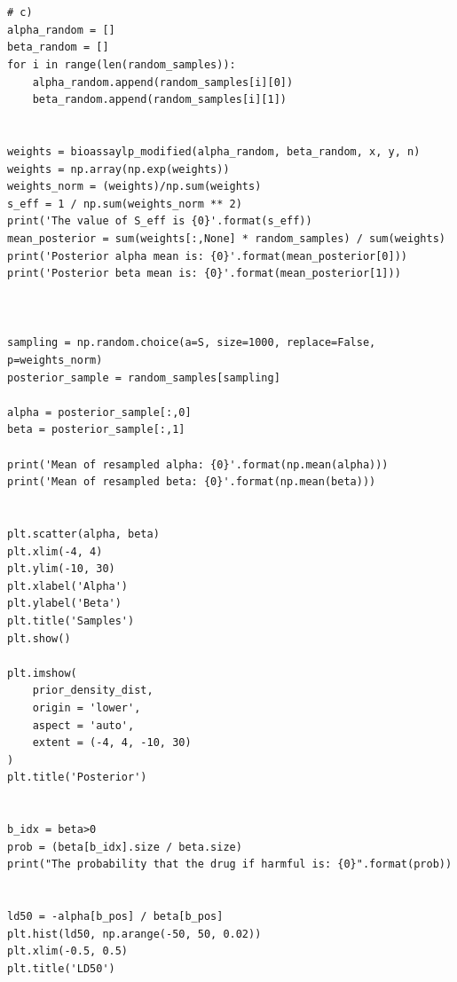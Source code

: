 \documentclass[17pt]{article}
\begin{document}
\begin{lstlisting}
    
    
# c)
alpha_random = []
beta_random = []
for i in range(len(random_samples)):
    alpha_random.append(random_samples[i][0])
    beta_random.append(random_samples[i][1])

    
weights = bioassaylp_modified(alpha_random, beta_random, x, y, n)
weights = np.array(np.exp(weights))
weights_norm = (weights)/np.sum(weights)
s_eff = 1 / np.sum(weights_norm ** 2)
print('The value of S_eff is {0}'.format(s_eff))
mean_posterior = sum(weights[:,None] * random_samples) / sum(weights)
print('Posterior alpha mean is: {0}'.format(mean_posterior[0]))
print('Posterior beta mean is: {0}'.format(mean_posterior[1]))



sampling = np.random.choice(a=S, size=1000, replace=False, p=weights_norm)
posterior_sample = random_samples[sampling]

alpha = posterior_sample[:,0]
beta = posterior_sample[:,1]

print('Mean of resampled alpha: {0}'.format(np.mean(alpha)))
print('Mean of resampled beta: {0}'.format(np.mean(beta)))


plt.scatter(alpha, beta)
plt.xlim(-4, 4)
plt.ylim(-10, 30)
plt.xlabel('Alpha')
plt.ylabel('Beta')
plt.title('Samples')
plt.show()

plt.imshow(
    prior_density_dist,
    origin = 'lower',
    aspect = 'auto',
    extent = (-4, 4, -10, 30)
)
plt.title('Posterior')


b_idx = beta>0
prob = (beta[b_idx].size / beta.size)
print("The probability that the drug if harmful is: {0}".format(prob))


ld50 = -alpha[b_pos] / beta[b_pos]
plt.hist(ld50, np.arange(-50, 50, 0.02))
plt.xlim(-0.5, 0.5)
plt.title('LD50')

\end{lstlisting}
\end{document}

